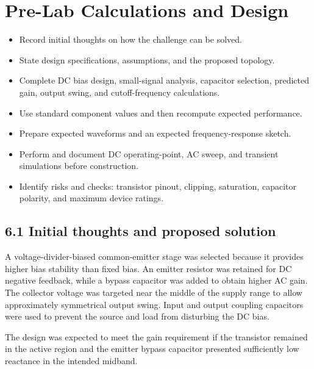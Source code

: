 \documentclass[11pt,a4paper]{article}
\begin{document}
\section{Pre-Lab Calculations and Design}
\begin{sectionguide}
\begin{itemize}
  \item Record initial thoughts on how the challenge can be solved.
  \item State design specifications, assumptions, and the proposed topology.
  \item Complete DC bias design, small-signal analysis, capacitor selection,
        predicted gain, output swing, and cutoff-frequency calculations.
  \item Use standard component values and then recompute expected performance.
  \item Prepare expected waveforms and an expected frequency-response sketch.
  \item Perform and document DC operating-point, AC sweep, and transient
        simulations before construction.
  \item Identify risks and checks: transistor pinout, clipping, saturation,
        capacitor polarity, and maximum device ratings.
\end{itemize}
\end{sectionguide}

\subsection*{6.1 Initial thoughts and proposed solution}

\begin{examplebox}
A voltage-divider-biased common-emitter stage was selected because it provides
higher bias stability than fixed bias. An emitter resistor was retained for DC
negative feedback, while a bypass capacitor was added to obtain higher AC
gain. The collector voltage was targeted near the middle of the supply range
to allow approximately symmetrical output swing. Input and output coupling
capacitors were used to prevent the source and load from disturbing the DC
bias.

The design was expected to meet the gain requirement if the transistor
remained in the active region and the emitter bypass capacitor presented
sufficiently low reactance in the intended midband.
\end{examplebox}
\end{document}
